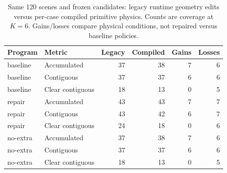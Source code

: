 \begin{table}[H]\centering\small
\caption{Same 120 scenes and frozen candidates: legacy runtime geometry edits versus per-case compiled primitive physics. Counts are coverage at $K=6$. Gains/losses compare physical conditions, not repaired versus baseline policies.}
\label{tab:v3-physics}
\begin{tabular}{llrrrr}\toprule
Program & Metric & Legacy & Compiled & Gains & Losses \\\midrule
baseline & Accumulated & 37 & 38 & 7 & 6 \\
baseline & Contiguous & 37 & 37 & 6 & 6 \\
baseline & Clear contiguous & 18 & 13 & 0 & 5 \\
repair & Accumulated & 43 & 43 & 7 & 7 \\
repair & Contiguous & 43 & 42 & 6 & 7 \\
repair & Clear contiguous & 24 & 18 & 0 & 6 \\
no-extra & Accumulated & 37 & 38 & 7 & 6 \\
no-extra & Contiguous & 37 & 37 & 6 & 6 \\
no-extra & Clear contiguous & 18 & 13 & 0 & 5 \\
\bottomrule\end{tabular}\end{table}
